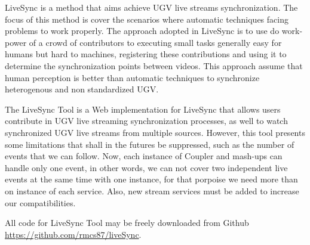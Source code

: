 
LiveSync is a method that aims achieve UGV live streams synchronization. The focus of this method is cover the scenarios where automatic techniques facing problems to work properly. The approach adopted in LiveSync is to use do work-power of a crowd of contributors to executing small tasks generally easy for humans but hard to machines, registering these contributions and using it to determine the synchronization points between videos. This approach assume that human perception is better than automatic techniques to synchronize heterogenous and non standardized UGV.

The LiveSync Tool is a Web implementation for LiveSync that allows users contribute in UGV live streaming synchronization processes, as well to watch synchronized UGV live streams from multiple sources. However, this tool presents some limitations that shall in the futures be suppressed, such as the number of events that we can follow. Now, each instance of Coupler and mash-ups can handle only one event, in other words, we can not cover two independent live events at the same time with one instance, for that porpoise we need more than on instance of each service. Also, new stream services must be added to increase our compatibilities.

All code for LiveSync Tool may be freely downloaded from Github \url{https://github.com/rmcs87/liveSync}.
